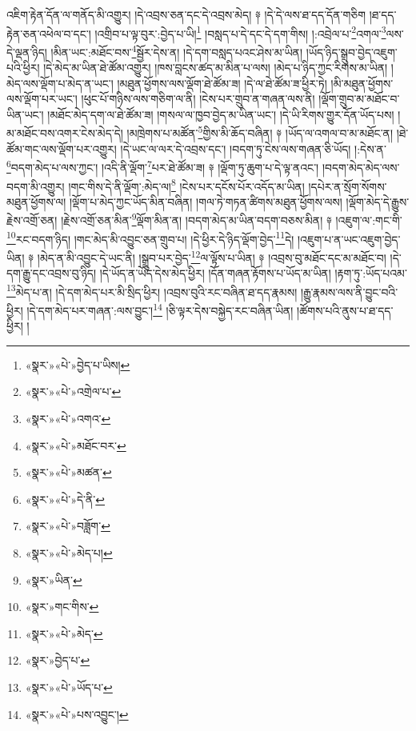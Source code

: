 འཇིག་རྟེན་དོན་ལ་གནོད་མི་འགྱུར། །དེ་འབྲས་ཅན་དང་དེ་འབྲས་མེད། ༈ །དེ་དེ་ལས་ཐ་དད་དོན་གཅིག །ཐ་དད་རྟེན་ཅན་འཕེལ་བ་དང་། །འགྲིབ་པ་ལྟ་བུར་:བྱེད་པ་ཡི།\footnote{«སྣར་»«པེ་»བྱེད་པ་ཡིས།} །བསླད་པ་དེ་དང་དེ་དག་གིས། །:འབྲེལ་པ་\footnote{«སྣར་»«པེ་»འགྲེལ་པ་}འགལ་\footnote{«སྣར་»«པེ་»འགའ་}ལས་དེ་ལྡན་ཉིད། །མིན་ཡང་:མཐོང་བས་\footnote{«སྣར་»«པེ་»མཐོང་བར་}སྦྱོར་དེས་ན། །དེ་དག་བསླད་པའང་ཤེས་མ་ཡིན། །ཡོད་ཉིད་སྒྲུབ་བྱེད་འཇུག་པའི་ཕྱིར། །དེ་མེད་མ་ཡིན་ཐེ་ཚོམ་འགྱུར། །ཁས་བླངས་ཚད་མ་མིན་པ་ལས། །མེད་པ་ཉིད་ཀྱང་རིགས་མ་ཡིན། །མེད་ལས་ལྡོག་པ་མེད་ན་ཡང་། །མཐུན་ཕྱོགས་ལས་ལྡོག་ཐེ་ཚོམ་ཟ། །དེ་ལ་ཐེ་ཚོམ་ཟ་ཕྱིར་ཏེ། །མི་མཐུན་ཕྱོགས་ལས་ལྡོག་པར་ཡང་། །ཕུང་པོ་གཉིས་ལས་གཅིག་ལ་ནི། །ངེས་པར་གྲུབ་ན་གཞན་ལས་ནི། །ལྡོག་གྲུབ་མ་མཐོང་བ་ཡིན་ཡང་། །མཐོང་མེད་དག་ལ་ཐེ་ཚོམ་ཟ། །གསལ་ལ་ཁྱབ་བྱེད་མ་ཡིན་ཡང་། །དེ་ཡི་རིགས་གྱུར་དོན་ཡོད་པས། །མ་མཐོང་བས་འགར་ངེས་མེད་དེ། །མཁྲེགས་པ་མཚོན་\footnote{«སྣར་»«པེ་»མཚན་}གྱིས་མི་ཆོད་བཞིན། ༈ །ཡོད་ལ་འགལ་བ་མ་མཐོང་ན། །ཐེ་ཚོམ་གང་ལས་ལྡོག་པར་འགྱུར། །དེ་ཡང་ལ་ལར་དེ་འབྲས་དང་། །བདག་ཏུ་ངེས་ལས་གཞན་ཅི་ཡོད། །:དེས་ན་\footnote{«སྣར་»«པེ་»དེ་ནི་}བདག་མེད་པ་ལས་ཀྱང་། །འདི་ནི་ལྡོག་\footnote{«སྣར་»«པེ་»བཟློག་}པར་ཐེ་ཚོམ་ཟ། ༈ །ལྡོག་ཏུ་ཆུག་པ་དེ་ལྟ་ནའང་། །བདག་མེད་མེད་ལས་བདག་མི་འགྱུར། །གང་གིས་དེ་ནི་ལྡོག་:མེད་ལ།\footnote{«སྣར་»«པེ་»མེད་པ།} །ངེས་པར་དངོས་པོར་འདོད་མ་ཡིན། །དཔེར་ན་སྲོག་སོགས་མཐུན་ཕྱོགས་ལ། །ལྡོག་པ་མེད་ཀྱང་ཡོད་མིན་བཞིན། །གལ་ཏེ་གཏན་ཚིགས་མཐུན་ཕྱོགས་ལས། །ལྡོག་མེད་དེ་རྒྱུས་རྗེས་འགྲོ་ཅན། །རྗེས་འགྲོ་ཅན་མིན་\footnote{«སྣར་»ཡིན་}ལྡོག་མིན་ན། །བདག་མེད་མ་ཡིན་བདག་བཅས་མིན། ༈ །འཇུག་ལ་:གང་གི་\footnote{«སྣར་»གང་གིས་}རང་བདག་ཉིད། །གང་མེད་མི་འབྱུང་ཅན་གྲུབ་པ། །དེ་ཕྱིར་དེ་ཉིད་ལྡོག་བྱེད་\footnote{«སྣར་»«པེ་»མེད་}དེ། །འཇུག་པ་ན་ཡང་འཇུག་བྱེད་ཡིན། ༈ །མེད་ན་མི་འབྱུང་དེ་ཡང་ནི། །སྒྲུབ་པར་བྱེད་\footnote{«སྣར་»བྱེད་པ་}ལ་ལྟོས་པ་ཡིན། ༈ །འབྲས་བུ་མཐོང་དང་མ་མཐོང་བ། །དེ་དག་རྒྱུ་དང་འབྲས་བུ་ཉིད། །དེ་ཡོད་ན་ཡོད་དེས་མེད་ཕྱིར། །དོན་གཞན་རྟོགས་པ་ཡོད་མ་ཡིན། །རྟག་ཏུ་:ཡོད་པའམ་\footnote{«སྣར་»«པེ་»ཡོད་པ་}མེད་པ་ན། །དེ་དག་མེད་པར་མི་སྲིད་ཕྱིར། །འབྲས་བུའི་རང་བཞིན་ཐ་དད་རྣམས། །རྒྱུ་རྣམས་ལས་ནི་བྱུང་བའི་ཕྱིར། །དེ་དག་མེད་པར་གཞན་:ལས་བྱུང་།\footnote{«སྣར་»«པེ་»པས་འབྱུང་།} །ཅི་ལྟར་དེས་བསྐྱེད་རང་བཞིན་ཡིན། །ཚོགས་པའི་ནུས་པ་ཐ་དད་ཕྱིར། །
